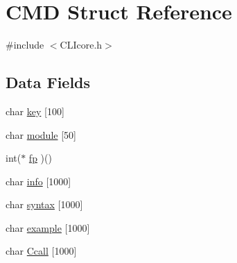 \hypertarget{structCMD}{\section{C\+M\+D Struct Reference}
\label{structCMD}
}


{\ttfamily \#include $<$C\+L\+Icore.\+h$>$}

\subsection*{Data Fields}
\begin{DoxyCompactItemize}
\item 
char \hyperlink{structCMD_ab3aedae0ea688867922c5db16e0c136f}{key} \mbox{[}100\mbox{]}
\item 
char \hyperlink{structCMD_a4cdcd2100bc392217fc7b794e20a261a}{module} \mbox{[}50\mbox{]}
\item 
int($\ast$ \hyperlink{structCMD_a975a22ae744796142cd5545b506662e5}{fp} )()
\item 
char \hyperlink{structCMD_a008f20bb66a74f15dc4e9536ca19dd9a}{info} \mbox{[}1000\mbox{]}
\item 
char \hyperlink{structCMD_af841a2189f9e693dd3ec530d368d3e92}{syntax} \mbox{[}1000\mbox{]}
\item 
char \hyperlink{structCMD_ace2e43b45ffe9d3be7e053c864b2807e}{example} \mbox{[}1000\mbox{]}
\item 
char \hyperlink{structCMD_a4444ae77b67843964c412bb7f283c373}{Ccall} \mbox{[}1000\mbox{]}
\end{DoxyCompactItemize}


